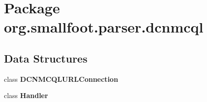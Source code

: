\section{Package org.\+smallfoot.\+parser.\+dcnmcql}
\label{namespaceorg_1_1smallfoot_1_1parser_1_1dcnmcql}
\subsection*{Data Structures}
\begin{DoxyCompactItemize}
\item 
class {\bf D\+C\+N\+M\+C\+Q\+L\+U\+R\+L\+Connection}
\item 
class {\bf Handler}
\end{DoxyCompactItemize}
